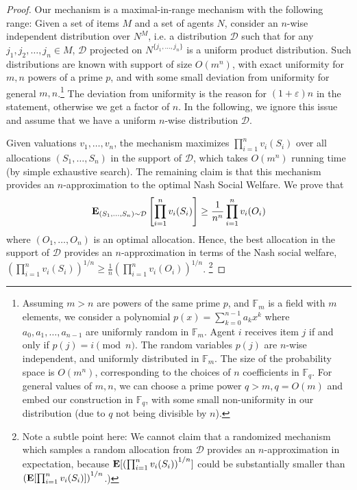 \documentclass{theoretics}
\newcommand{\eps}{\varepsilon}
\newcommand{\FF}{\mathbb F}
\newcommand{\E}{\mbox{\bf E}}
\newcommand{\cD}{{\mathcal D}}
\begin{document}
\begin{proof}
Our mechanism is a maximal-in-range mechanism with the following range: Given a set of items $M$ and a set of agents $N$, consider an $n$-wise independent distribution over $N^M$, i.e. a distribution $\cD$ such that for any $j_1,j_2,\ldots,j_n \in M$, $\cD$ projected on $N^{\{j_1,\ldots,j_n\}}$ is a uniform product distribution. Such distributions are known with support of size $O(m^n)$, with exact uniformity for $m,n$ powers of a prime $p$, and with some small deviation from uniformity for general $m,n$.\footnote{Assuming $m > n$ are powers of the same prime $p$, and $\FF_m$ is a field with $m$ elements, we consider a polynomial $p(x) = \sum_{k=0}^{n-1} a_k x^k$ where $a_0,a_1,\ldots,a_{n-1}$ are uniformly random in $\FF_m$. Agent $i$ receives item $j$ if and only if $p(j) = i \pmod n$. The random variables $p(j)$ are $n$-wise independent, and uniformly distributed in $\FF_m$. The size of the probability space is $O(m^n)$, corresponding to the choices of $n$ coefficients in $\FF_q$. For general values of $m,n$, we can choose a prime power $q > m, q = O(m)$ and embed our construction in $\FF_q$, with some small non-uniformity in our distribution (due to $q$ not being divisible by $n$).}
The deviation from uniformity is the reason for $(1+\eps)n$ in the statement, otherwise we get a factor of $n$. In the following, we ignore this issue and assume that we have a uniform $n$-wise distribution $\cD$. 

Given valuations $v_1,\ldots,v_n$, the mechanism maximizes $\prod_{i=1}^{n} v_i(S_i)$ over all allocations $(S_1,\ldots,S_n)$ in the support of $\cD$, which takes $O(m^n)$ running time (by simple exhaustive search). The remaining claim is that this mechanism provides an $n$-approximation to the optimal Nash Social Welfare. We prove that
\begin{equation}
\label{eq:n-approx}
\E_{(S_1,\ldots,S_n) \sim \cD}\left[\prod_{i=1}^{n} v_i(S_i) \right] \geq \frac{1}{n^n} \prod_{i=1}^{n} v_i(O_i)
\end{equation}
where $(O_1,\ldots,O_n)$ is an optimal allocation. Hence, the best allocation in the support of $\cD$ provides an $n$-approximation in terms of the Nash social welfare, $\left( \prod_{i=1}^{n} v_i(S_i) \right)^{1/n} \geq \frac{1}{n} \left( \prod_{i=1}^{n} v_i(O_i) \right)^{1/n}$. \footnote{Note a subtle point here: We cannot claim that a randomized mechanism which samples a random allocation from $\cD$ provides an $n$-approximation in expectation, because $\E[\left( \prod_{i=1}^{n} v_i(S_i) \right)^{1/n}]$ could be substantially smaller than $\left( \E[\prod_{i=1}^{n} v_i(S_i)] \right)^{1/n}$.)}


\end{proof}
\end{document}
